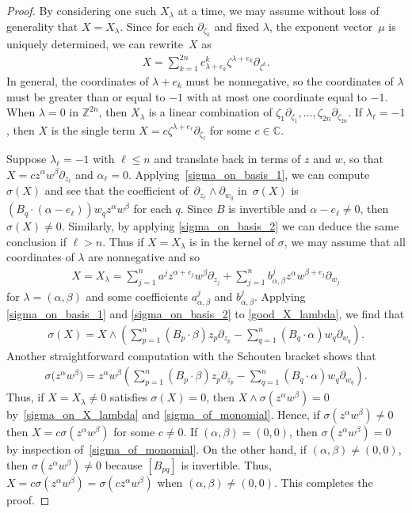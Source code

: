 \documentclass[pdftex]{sigma}
\numberwithin{equation}{section}
\begin{document}
\begin{proof}
By considering one such $X_\lambda$ at a time, we may assume without loss of generality that $X=X_\lambda$. Since for each $\partial_{\zeta_k}$ and f\/ixed $\lambda$, the exponent vector~$\mu$ is uniquely determined, we can rewrite~$X$ as
\begin{gather*}
X=\sum_{k=1}^{2n} c^k_{\lambda+e_k} \zeta^{\lambda+e_k}\partial_{\zeta^k}.
\end{gather*}
In general, the coordinates of $\lambda+e_k$ must be nonnegative, so the coordinates of $\lambda$ must be greater than or equal to $-1$ with at most one coordinate equal to $-1$. When $\lambda=0$ in ${\mathbb Z}^{2n}$, then $X_\lambda$ is a linear combination of $\zeta_1\partial_{\zeta_1},\dots,\zeta_{2n} \partial_{\zeta_{2n}}$. If $\lambda_\ell=-1$, then $X$ is the single term $X=c\zeta^{\lambda+ e_\ell}\partial_{\zeta_\ell}$ for some $c\in{\mathbb C}$.

Suppose $\lambda_\ell=-1$ with $\ell\le n$ and translate back in terms of $z$ and $w$, so that $X=cz^\alpha w^\beta \partial_{z_\ell}$ and $\alpha_\ell=0$.
Applying~\eqref{sigma_on_basis_1}, we can compute~$\sigma(X)$ and see that the coef\/f\/icient of~$\partial_{z_\ell}\wedge \partial_{w_q}$ in~$\sigma(X)$ is $(B_q\cdot (\alpha-e_\ell))w_qz^{\alpha}w^\beta$ for each $q$. Since $B$ is invertible and $\alpha-e_\ell\ne 0$, then $\sigma(X)\ne 0$. Similarly, by applying \eqref{sigma_on_basis_2} we can deduce the same conclusion if $\ell>n$. Thus if $X=X_\lambda$ is in the kernel of $\sigma$, we may assume that all coordinates of $\lambda$ are nonnegative and so
\begin{gather}\label{good_X_lambda}
X=X_\lambda=\sum_{j=1}^n a^j z^{\alpha+e_j}w^\beta \partial_{z_j}+\sum_{j=1}^n b^j_{\alpha,\beta} z^\alpha w^{\beta+e_j}\partial_{w_j}
\end{gather}
for $\lambda=(\alpha,\beta)$ and some coef\/f\/icients $a^j_{\alpha,\beta}$ and $b^j_{\alpha,\beta}$.
Applying \eqref{sigma_on_basis_1} and \eqref{sigma_on_basis_2} to \eqref{good_X_lambda}, we f\/ind that
\begin{gather}\label{sigma_on_X_lambda}
\sigma(X)=X\wedge \left(\sum_{p=1}^n (B_p\cdot \beta)z_p\partial_{z_p}-\sum_{q=1}^n (B_q\cdot \alpha) w_q\partial_{w_q}\right).
\end{gather}
Another straightforward computation with the Schouten bracket shows that
\begin{gather}\label{sigma_of_monomial}
\sigma\big(z^\alpha w^\beta\big)=z^\alpha w^\beta \left(\sum_{p=1}^n (B_p\cdot \beta)z_p\partial_{z_p}-\sum_{q=1}^n (B_q\cdot \alpha) w_q\partial_{w_q}\right).
\end{gather}
Thus, if $X=X_\lambda\not=0$ satisf\/ies $\sigma(X)=0$, then $X\wedge \sigma(z^\alpha w^\beta)=0$ by~\eqref{sigma_on_X_lambda} and \eqref{sigma_of_monomial}. Hence, if $\sigma(z^\alpha w^\beta)\not=0$ then $X=c\sigma(z^\alpha w^\beta)$ for some $c\not=0$. If $(\alpha,\beta)=(0,0)$, then $\sigma(z^\alpha w^\beta)=0$ by inspection of~\eqref{sigma_of_monomial}. On the other hand, if $(\alpha,\beta)\not=(0,0)$, then $\sigma(z^\alpha w^\beta)\not=0$ because $[B_{pq}]$ is invertible. Thus, $X=c\sigma(z^\alpha w^\beta)=\sigma(cz^\alpha w^\beta)$ when $(\alpha,\beta)\not=(0,0)$. This completes the proof.
\end{proof}
\end{document}

